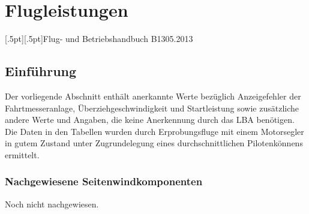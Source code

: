 
\chapter{ Flugleistungen}

[.5pt][.5pt]{\pagemark}{}{\headmark}{Flug- und Betriebshandbuch B13}{}{05.2013}
\pagestyle{Flughandbuch}
\renewcommand*\chapterpagestyle{Flughandbuch}


\section{Einführung}
Der vorliegende Abschnitt enthält anerkannte Werte bezüglich Anzeigefehler der
Fahrtmesseranlage, Überziehgeschwindigkeit und Startleistung sowie zusätzliche
andere Werte und Angaben, die keine Anerkennung durch das LBA benötigen.
Die Daten in den Tabellen wurden durch Erprobungsfluge mit einem Motorsegler
in gutem Zustand unter Zugrundelegung eines durchschnittlichen Pilotenkönnens
ermittelt.

\newpage


\subsection{Nachgewiesene Seitenwindkomponenten}
Noch nicht nachgewiesen.
%
